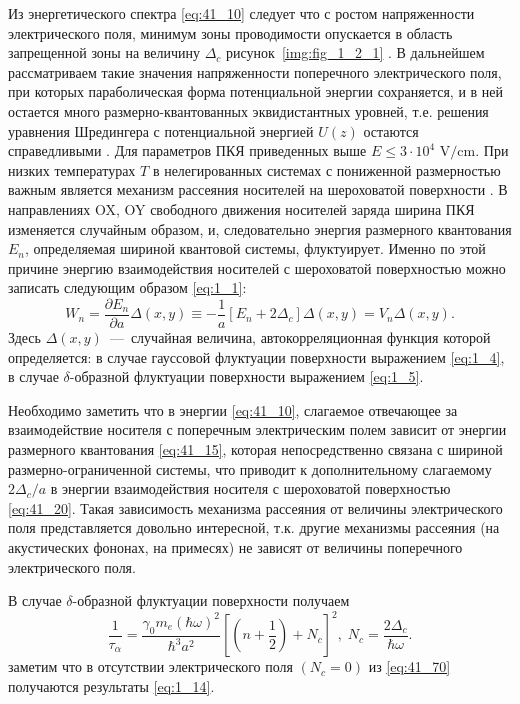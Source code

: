 Из энергетического спектра \eqref{eq:41_10} следует что с ростом напряженности электрического поля, минимум зоны проводимости опускается в область запрещенной зоны на величину $\Delta_c$ рисунок~\ref{img:fig_1_2_1} . В дальнейшем рассматриваем такие значения напряженности поперечного электрического поля, при которых параболическая форма потенциальной энергии сохраняется, и в ней остается много размерно-квантованных эквидистантных уровней, т.е. решения уравнения Шредингера с потенциальной энергией $U(z)$ остаются справедливыми \cite{Kanarovskii1995}. Для параметров ПКЯ приведенных выше $E\le 3\cdot 10^4\text{ V/cm}$. При низких температурах $T$ в нелегированных системах с пониженной размерностью важным является механизм рассеяния носителей на шероховатой поверхности \cite{Sakaki1987,Vurgaftman1999}. В направлениях OX, OY свободного движения носителей заряда ширина ПКЯ изменяется случайным образом, и, следовательно энергия размерного квантования $E_n$, определяемая шириной квантовой системы, флуктуирует. Именно по этой причине энергию взаимодействия носителей с шероховатой поверхностью можно записать следующим образом \eqref{eq:1_1}:
\begin{equation} \label{eq:41_20}
W_{n} =\frac{\partial E_n }{\partial a} \Delta(x,y) \equiv -\frac{1}{a} \left[ E_n +2\Delta_c \right] \Delta (x,y)=V_n \Delta (x,y).
\end{equation}
Здесь $\Delta (x,y)$~---~случайная величина, автокорреляционная функция которой определяется: в случае гауссовой флуктуации поверхности выражением \eqref{eq:1_4}, в случае $\delta$-образной флуктуации поверхности выражением \eqref{eq:1_5}.

Необходимо заметить что в энергии \eqref{eq:41_10}, слагаемое отвечающее за взаимодействие носителя с поперечным электрическим полем зависит от энергии размерного квантования \eqref{eq:41_15}, которая непосредственно связана с шириной размерно-ограниченной системы, что приводит к дополнительному слагаемому $2\Delta_c / a$ в энергии взаимодействия носителя с шероховатой поверхностью \eqref{eq:41_20}. Такая зависимость механизма рассеяния от величины электрического поля представляется довольно интересной, т.к. другие механизмы рассеяния (на акустических фононах, на примесях) не зависят от величины поперечного электрического поля.

В случае $\delta $-образной флуктуации поверхности получаем
\begin{equation} \label{eq:41_70}
\frac{1}{\tau _{\alpha } } =\frac{\gamma_0 m_e (\hbar\omega)^2 }{\hbar^3 a^2 } \left[\left(n+\frac{1}{2} \right)+N_c \right]^2, \;
N_c =\frac{2\Delta_c }{\hbar \omega } .
\end{equation}  
заметим что в отсутствии электрического поля $(N_c = 0)$ из \eqref{eq:41_70} получаются результаты \eqref{eq:1_14}.

